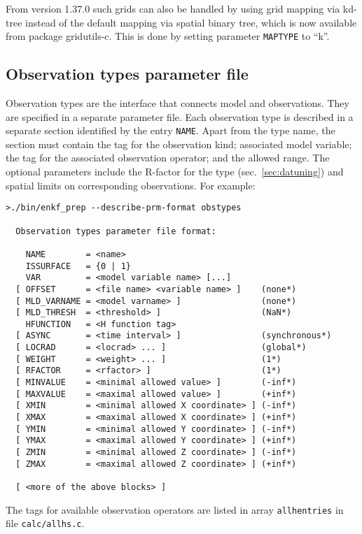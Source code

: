 \documentclass[11pt]{report}
\begin{document}
From version 1.37.0 such grids can also be handled by using grid mapping via kd-tree instead of the default mapping via spatial binary tree, which is now available from package gridutils-c.
This is done by setting parameter \verb|MAPTYPE| to ``k''.

\subsection{Observation types parameter file}
\label{sec:obstypesprm}

Observation types are the interface that connects model and observations.
They are specified in a separate parameter file.
Each observation type is described in a separate section identified by the entry \verb|NAME|.
Apart from the type name, the section must contain the tag for the observation kind; associated model variable; the tag for the associated observation operator; and the allowed range.
The optional parameters include the R-factor for the type (sec.~\ref{sec:datuning}) and spatial limits on corresponding observations.
For example:
\begin{Verbatim}[frame=single,fontsize=\footnotesize]
>./bin/enkf_prep --describe-prm-format obstypes

  Observation types parameter file format:

    NAME        = <name>
    ISSURFACE   = {0 | 1}
    VAR         = <model variable name> [...]
  [ OFFSET      = <file name> <variable name> ]    (none*)
  [ MLD_VARNAME = <model varname> ]                (none*)
  [ MLD_THRESH  = <threshold> ]                    (NaN*)
    HFUNCTION   = <H function tag>
  [ ASYNC       = <time interval> ]                (synchronous*)
  [ LOCRAD      = <locrad> ... ]                   (global*)
  [ WEIGHT      = <weight> ... ]                   (1*)
  [ RFACTOR     = <rfactor> ]                      (1*)
  [ MINVALUE    = <minimal allowed value> ]        (-inf*)
  [ MAXVALUE    = <maximal allowed value> ]        (+inf*)
  [ XMIN        = <minimal allowed X coordinate> ] (-inf*)
  [ XMAX        = <maximal allowed X coordinate> ] (+inf*)
  [ YMIN        = <minimal allowed Y coordinate> ] (-inf*)
  [ YMAX        = <maximal allowed Y coordinate> ] (+inf*)
  [ ZMIN        = <minimal allowed Z coordinate> ] (-inf*)
  [ ZMAX        = <maximal allowed Z coordinate> ] (+inf*)

  [ <more of the above blocks> ]
\end{Verbatim}

The tags for available observation operators are listed in array \verb|allhentries| in file \verb|calc/allhs.c|.
\end{document}
